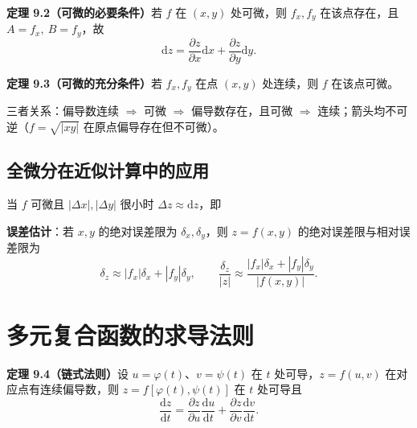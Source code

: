 \textbf{定理 9.2（可微的必要条件）}\quad 若 $f$ 在 $(x,y)$ 处可微，则 $f_x,f_y$ 在该点存在，且 $A=f_x,\ B=f_y$，故
\begin{equation}
\mathrm dz=\frac{\partial z}{\partial x}\mathrm dx+\frac{\partial z}{\partial y}\mathrm dy .
\end{equation}

\textbf{定理 9.3（可微的充分条件）}\quad 若 $f_x,f_y$ 在点 $(x,y)$ 处连续，则 $f$ 在该点可微。


三者关系：偏导数连续 $\Rightarrow$ 可微 $\Rightarrow$ 偏导数存在，且可微 $\Rightarrow$ 连续；箭头均不可逆（$f=\sqrt{|xy|}$ 在原点偏导存在但不可微）。


\subsection{全微分在近似计算中的应用}

当 $f$ 可微且 $|\Delta x|,|\Delta y|$ 很小时 $\Delta z\approx\mathrm dz$，即


\textbf{误差估计}：若 $x,y$ 的绝对误差限为 $\delta_x,\delta_y$，则 $z=f(x,y)$ 的绝对误差限与相对误差限为
\begin{equation}
\delta_z\approx|f_x|\delta_x+|f_y|\delta_y,\qquad
\frac{\delta_z}{|z|}\approx\frac{|f_x|\delta_x+|f_y|\delta_y}{|f(x,y)|}.
\end{equation}


\section{多元复合函数的求导法则}

\textbf{定理 9.4（链式法则）}\quad 设 $u=\varphi(t)$、$v=\psi(t)$ 在 $t$ 处可导，$z=f(u,v)$ 在对应点有连续偏导数，则 $z=f[\varphi(t),\psi(t)]$ 在 $t$ 处可导且
\begin{equation}
\frac{\mathrm dz}{\mathrm dt}=\frac{\partial z}{\partial u}\frac{\mathrm du}{\mathrm dt}+\frac{\partial z}{\partial v}\frac{\mathrm dv}{\mathrm dt}.
\end{equation}

